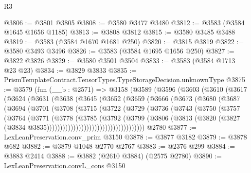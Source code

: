 \begin{lexlean}{R3}
\begin{coremodule}
@3806 := @3801 @3805
@3808 := @3580 @3477 @3480
@3812 := @3583 (@3584 @1645 @1656 @1185)
@3813 := @3808 @3812
@3815 := @3580 @3485 @3488
@3819 := @3583 (@3584 @1670 @1681 @250)
@3820 := @3815 @3819
@3822 := @3580 @3493 @3496
@3826 := @3583 (@3584 @1695 @1656 @250)
@3827 := @3822 @3826
@3829 := @3580 @3501 @3504
@3833 := @3583 (@3584 @1713 @23 @23)
@3834 := @3829 @3833
@3835 := PrismTemplateContract.TensorTypes.TypeStorageDecision.unknownType
@3875 := @3579
    (fun (__b : @2571) =>
    @3158
      (@3589
        (@3596
          (@3603
            (@3610
              (@3617
                (@3624
                  (@3631
                    (@3638
                      (@3645
                        (@3652
                          (@3659
                            (@3666
                              (@3673
                                (@3680
                                  (@3687
                                    (@3694
                                      (@3701
                                        (@3708
                                          (@3715
                                            (@3722
                                              (@3729
                                                (@3736
                                                  (@3743
                                                    (@3750
                                                      (@3757
                                                        (@3764
                                                          (@3771
                                                            (@3778
                                                              (@3785
                                                                (@3792
                                                                  (@3799
                                                                    (@3806
                                                                      (@3813
                                                                        (@3820
                                                                          (@3827
                                                                            (@3834
                                                                              @3835)))))))))))))))))))))))))))))))))))))
    @2780
@3877 := LexLeanPreservation.conv_prim @3150
@3878 := @3877 @3182
@3879 := @3878 @682
@3882 := @3879 @1048 @2770 @2767
@3883 := @2376 @299
@3884 := @3883 @2414
@3888 := @3882 (@2610 @3884) (@2575 @2780)
@3890 := LexLeanPreservation.convL_cons @3150

\end{coremodule}
\end{lexlean}
